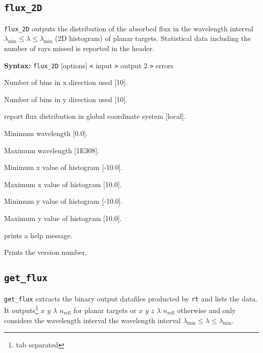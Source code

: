 \documentclass[10pt,a4paper,titlepage]{article}
\begin{document}
\subsection{{\tt flux\_2D}}
{\tt flux\_2D} outputs the distribution of the absorbed flux in the wavelength interval $ \lambda_\mathrm{min} \le \lambda \le \lambda_\mathrm{min}$ (2D histogram) of planar targets. Statistical data including the number of rays missed is reported in the header.

{\bf Syntax:} {\tt flux\_2D} [options] {\tt <} input {\tt >} output 2 {\tt >} errors
\vspace{1em}
\begin{list}{}
{\setlength{\leftmargin}{3.5cm}
\setlength{\labelwidth}{3.0cm}
\setlength{\labelsep}{0.25cm}
\setlength{\rightmargin}{0.5cm}}

\item[{\tt [--nx|-a]}] Number of bins in x direction used [10].
\item[{\tt [--ny|-b]}] Number of bins in y direction used [10].
\item[{\tt [--global|-g]}] report flux distribution in global coordinate system [local].
\item[{\tt [--minl|-l]}] Minimum wavelength [0.0].
\item[{\tt [--maxl|-L]}] Maximum wavelength [1E308].
\item[{\tt [--minx|-x]}] Minimum x value of histogram [-10.0].
\item[{\tt [--maxx|-X]}] Maximum x value of histogram [10.0].
\item[{\tt [--miny|-y]}] Minimum y value of histogram [-10.0].
\item[{\tt [--maxy|-Y]}] Maximum y value of histogram [10.0].
\item[{\tt [--help|-h]}] prints a help message.
\item[{\tt [--Version|-V]}] Prints the version number.

\end{list}

\subsection{{\tt get\_flux}}
{\tt get\_flux} extracts the binary output datafiles producted by {\tt rt} and lists the data. It outputs\footnote{tab separated} $x$ $y$ $\lambda$ $n_{\mathrm{refl}}$ for planar targets or $x$ $y$ $z$ $\lambda$ $n_{\mathrm{refl}}$ otherwise and only considers the wavelength interval the wavelength interval $ \lambda_\mathrm{min} \le \lambda \le \lambda_\mathrm{min}$.
\end{document}
